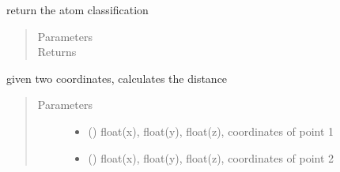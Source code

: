 \documentclass[letterpaper,10pt,english]{sphinxmanual}
\begin{document}
\begin{fulllineitems}
\begin{fulllineitems}
\begin{quote}
\begin{description}
\end{description}\end{quote}

\end{fulllineitems}


\begin{fulllineitems}
\label{\detokenize{hs_utilities_api:hotspots.hs_utilities.Helper.get_atom_type}}
return the atom classification
\begin{quote}\begin{description}
\item[{Parameters}] \leavevmode
{} \textendash{} 

\item[{Returns}] \leavevmode


\end{description}\end{quote}

\end{fulllineitems}


\begin{fulllineitems}
\label{\detokenize{hs_utilities_api:hotspots.hs_utilities.Helper.get_distance}}
given two coordinates, calculates the distance
\begin{quote}\begin{description}
\item[{Parameters}] \leavevmode\begin{itemize}
\item {} 
 () \textendash{} float(x), float(y), float(z), coordinates of point 1

\item {} 
 () \textendash{} float(x), float(y), float(z), coordinates of point 2


\end{itemize}
\end{description}
\end{quote}
\end{fulllineitems}
\end{fulllineitems}
\end{document}
